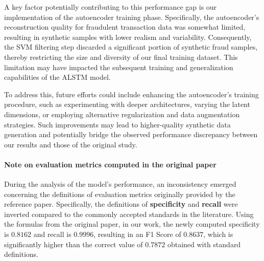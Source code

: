 A key factor potentially contributing to this performance gap is our implementation of the autoencoder training phase. Specifically, the autoencoder's reconstruction quality for fraudulent transaction data was somewhat limited, resulting in synthetic samples with lower realism and variability. Consequently, the SVM filtering step discarded a significant portion of synthetic fraud samples, thereby restricting the size and diversity of our final training dataset. This limitation may have impacted the subsequent training and generalization capabilities of the ALSTM model.

To address this, future efforts could include enhancing the autoencoder's training procedure, such as experimenting with deeper architectures, varying the latent dimensions, or employing alternative regularization and data augmentation strategies. Such improvements may lead to higher-quality synthetic data generation and potentially bridge the observed performance discrepancy between our results and those of the original study.

\paragraph{Note on evaluation metrics computed in the original paper}
During the analysis of the model's performance, an inconsistency emerged concerning the definitions of evaluation metrics originally provided by the reference paper. Specifically, the definitions of \textbf{specificity} and \textbf{recall} were inverted compared to the commonly accepted standards in the literature. Using the formulas from the original paper, in our work, the newly computed specificity is $0.8162$ and recall is $0.9996$, resulting in an F1 Score of $0.8637$, which is significantly higher than the correct value of $0.7872$ obtained with standard definitions.
